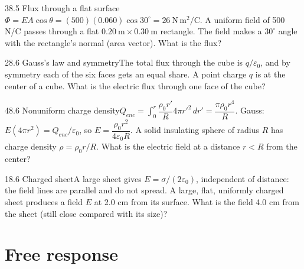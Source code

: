 \documentclass[11pt]{article}
\begin{document}
\begin{q}{3}{8.5 Flux through a flat surface}{$\Phi = EA\cos\theta = (500)(0.060)\cos 30^\circ = 26\ \mathrm{N\,m^2/C}$.}
A uniform field of 500 N/C passes through a flat $0.20\ \mathrm{m} \times 0.30\ \mathrm{m}$ rectangle. The field makes a $30^\circ$ angle with the rectangle's normal (area vector). What is the flux?
\end{q}
\begin{q}{2}{8.6 Gauss's law and symmetry}{The total flux through the cube is $q/\varepsilon_0$, and by symmetry each of the six faces gets an equal share.}
A point charge $q$ is at the center of a cube. What is the electric flux through one face of the cube?
\end{q}
\begin{q}{4}{8.6 Nonuniform charge density}{$Q_{enc} = \int_0^r \dfrac{\rho_0 r'}{R}4\pi r'^2\,dr' = \dfrac{\pi\rho_0 r^4}{R}$. Gauss: $E(4\pi r^2) = Q_{enc}/\varepsilon_0$, so $E = \dfrac{\rho_0 r^2}{4\varepsilon_0 R}$.}
A solid insulating sphere of radius $R$ has charge density $\rho = \rho_0 r/R$. What is the electric field at a distance $r < R$ from the center?
\end{q}
\begin{q}{1}{8.6 Charged sheet}{A large sheet gives $E = \sigma/(2\varepsilon_0)$, independent of distance: the field lines are parallel and do not spread.}
A large, flat, uniformly charged sheet produces a field $E$ at 2.0 cm from its surface. What is the field 4.0 cm from the sheet (still close compared with its size)?
\end{q}

\section{Free response}
\end{document}
